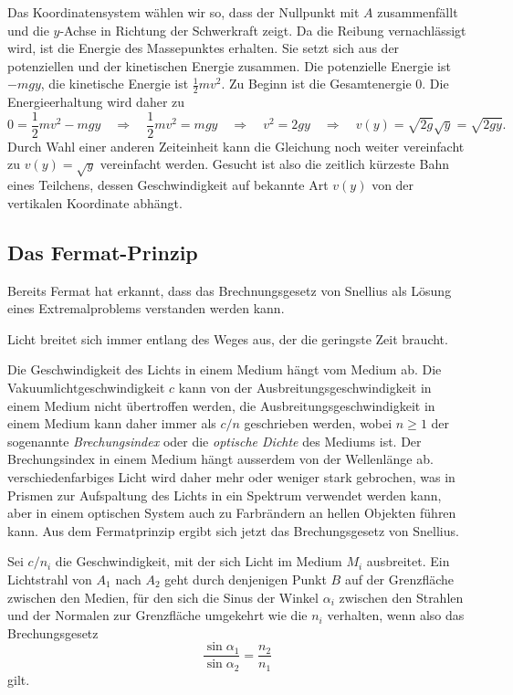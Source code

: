 Das Koordinatensystem wählen wir so, dass der Nullpunkt mit $A$ zusammenfällt
und die $y$-Achse in Richtung der Schwerkraft zeigt.
Da die Reibung vernachlässigt wird, ist die Energie des Massepunktes
erhalten.
Sie setzt sich aus der potenziellen und der kinetischen Energie
zusammen.
Die potenzielle Energie ist $-mgy$, die kinetische Energie ist
$\frac12mv^2$.
Zu Beginn ist die Gesamtenergie 0.
Die Energieerhaltung wird daher zu
\[
0=\frac12mv^2-mgy
\quad\Rightarrow\quad
\frac12mv^2=mgy
\quad\Rightarrow\quad
v^2=2gy
\quad\Rightarrow\quad
v(y)
=
\sqrt{2g}\!\sqrt{y}
=
\!\sqrt{2gy}.
\]
Durch Wahl einer anderen Zeiteinheit kann die Gleichung noch weiter
vereinfacht zu
\(
v(y) = \sqrt{y}
\)
vereinfacht werden.
Gesucht ist also die zeitlich kürzeste Bahn eines Teilchens, 
dessen Geschwindigkeit auf bekannte Art $v(y)$ von der vertikalen
Koordinate abhängt.

%
%
\subsection{Das Fermat-Prinzip}
%
Bereits Fermat hat erkannt, dass das Brechnungsgesetz von Snellius
als Lösung eines Extremalproblems verstanden werden kann.

\begin{satz}
\label{buch:variation:problem:satz:fermat-prinzip}
Licht breitet sich immer entlang des Weges aus, der die geringste
Zeit braucht.
\end{satz}

Die Geschwindigkeit des Lichts in einem Medium hängt vom Medium ab.
Die Vakuumlichtgeschwindigkeit $c$ kann von der Ausbreitungsgeschwindigkeit
in einem Medium nicht übertroffen werden, die Ausbreitungsgeschwindigkeit
in einem Medium kann daher immer als $c/n$ geschrieben werden, wobei
$n\ge 1$ der sogenannte {\em Brechungsindex} oder die {\em optische Dichte}
des Mediums ist.
%
%
%
Der Brechungsindex in einem Medium hängt ausserdem von der Wellenlänge ab.
verschiedenfarbiges Licht wird daher mehr oder weniger stark gebrochen,
was in Prismen zur Aufspaltung des Lichts in ein Spektrum verwendet
werden kann, aber in einem optischen System auch zu Farbrändern an
hellen Objekten führen kann.
Aus dem Fermatprinzip ergibt sich jetzt das Brechungsgesetz von 
Snellius.
%
%

\begin{satz}[Snellius]
\label{buch:variation:problem:satz:snellius}
Sei $c/n_i$ die Geschwindigkeit, mit der sich Licht im Medium $M_i$
ausbreitet.
Ein Lichtstrahl von $A_1$ nach $A_2$ geht durch denjenigen Punkt $B$ 
auf der Grenzfläche zwischen den Medien, für den sich die Sinus der
Winkel $\alpha_i$ zwischen den Strahlen und der Normalen zur Grenzfläche
umgekehrt wie die $n_i$ verhalten, wenn also das Brechungsgesetz
\[
\frac{\sin\alpha_1}{\sin\alpha_2}
=
\frac{n_2}{n_1}
\]
gilt.
\end{satz}

